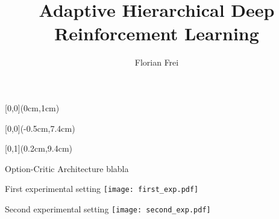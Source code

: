 \documentclass[hyperref={pdfpagelabels=false}]{beamer}
\title{Adaptive Hierarchical Deep Reinforcement Learning}
\author{Florian Frei}
\institute{ETH Zurich -- Distributed Computing Group -- www.disco.ethz.ch}
\begin{document}
{
\begin{frame}
	\begin{textblock*}{\paperwidth}[0,0](0cm,1cm)
		\begin{center}
			\textbf{\huge \inserttitle}
		\end{center}
	\end{textblock*}
	\begin{textblock*}{\paperwidth}[0,0](-0.5cm,7.4cm)
		\flushright
		\color{white}
		\itshape \insertauthor
	\end{textblock*}
	\begin{textblock*}{\paperwidth}[0,1](0.2cm,9.4cm)
		\flushleft
		\tiny \itshape \insertinstitute
	\end{textblock*}
\end{frame}
}

\begin{frame}{Option-Critic Architecture}
	blabla
\end{frame}

\begin{frame}{First experimental setting}
\texttt{[image: first\_exp.pdf]}
\end{frame}

\begin{frame}{Second experimental setting}
\texttt{[image: second\_exp.pdf]}
\end{frame}
\end{document}
